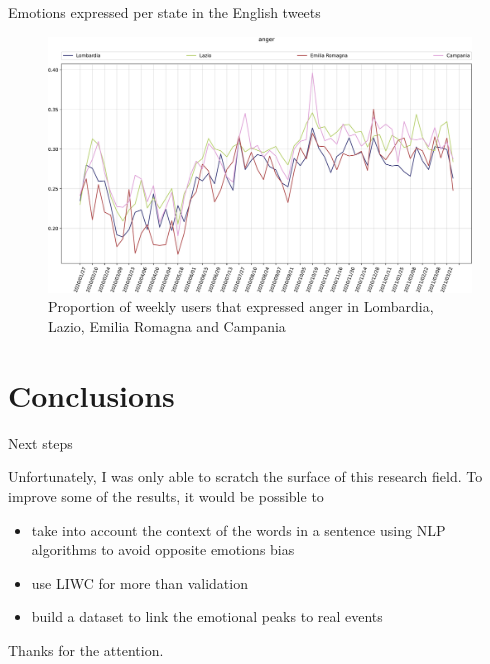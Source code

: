 \documentclass[8pt]{beamer}  %
\begin{document}
\begin{frame}{Emotions expressed per state in the English tweets}

    \begin{figure}[H]
	    \centering
    	\includegraphics[scale=.25]{assets/img/it_anger_4_states.svg.pdf}
    	\caption{Proportion of weekly users that expressed anger in Lombardia, Lazio, Emilia Romagna and Campania}
    	\label{fig:it-anger-4-states}
    \end{figure}
    
\end{frame}

\section{Conclusions}

\begin{frame}{Next steps}
    
    Unfortunately, I was only able to scratch the surface of this research field. To improve some of the results, it would be possible to
    
    \begin{itemize}
        \item take into account the context of the words in a sentence using NLP algorithms to avoid opposite emotions bias
        \item use LIWC for more than validation
        \item build a dataset to link the emotional peaks to real events
    \end{itemize}
    
\end{frame}

\begin{frame}

    \begin{center}
        \Large{Thanks for the attention.}
    \end{center}

\end{frame}
\end{document}
